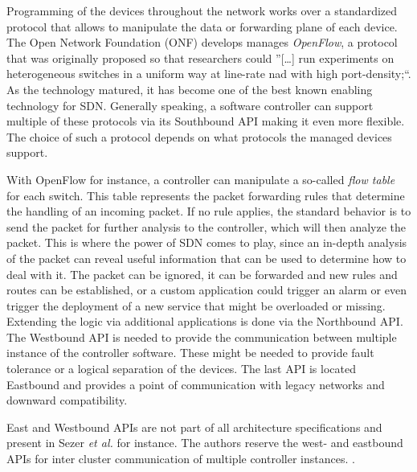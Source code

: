 \newpage
Programming of the devices throughout the network works over a standardized protocol that allows to manipulate the data or forwarding plane of each device. The Open Network Foundation (ONF) develops manages \textit{OpenFlow}, a protocol that was originally proposed so that researchers could ''[\dots] run experiments on heterogeneous switches in a uniform way at line-rate nad with high port-density;``\cite{mckeown2008openflow}. As the technology matured, it has become one of the best known enabling technology for SDN. Generally speaking, a software controller can support multiple of these protocols via its Southbound API making it even more flexible. The choice of such a protocol depends on what protocols the managed devices support. 

With OpenFlow for instance, a controller can manipulate a so-called \textit{flow table } for each switch. This table represents the packet forwarding rules that determine the handling of an incoming packet. If no rule applies, the standard behavior is to send the packet for further analysis to the controller, which will then analyze the packet. This is where the power of SDN comes to play, since an in-depth analysis of the packet can reveal useful information that can be used to determine how to deal with it. The packet can be ignored, it can be forwarded and new rules and routes can be established, or a custom application could trigger an alarm or even trigger the deployment of a new service that might be overloaded or missing. Extending the logic via additional applications is done via the Northbound API. The Westbound API is needed to provide the communication between multiple instance of the controller software. These might be needed to provide fault tolerance or a logical separation of the devices. The last API is located Eastbound and provides a point of communication with legacy networks and downward compatibility. 

East and Westbound APIs are not part of all architecture specifications and present in Sezer \textit{et al.} \cite{sezer2013we} for instance. The authors reserve the west- and eastbound APIs for inter cluster communication of multiple controller instances. \cite{hu2014survey} \cite{jarschel2014interfaces} \cite{nunes2014survey} \cite{sezer2013we} \cite{shin2012software} \cite{jammal2014software}.

